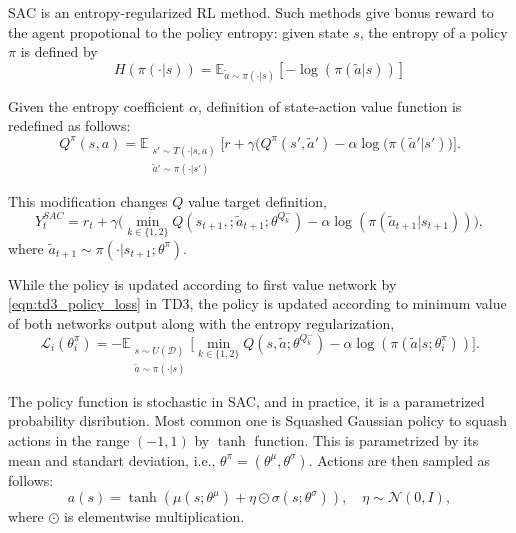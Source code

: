 \documentclass[a4paper, 12pt]{article} %
\begin{document}
SAC is an entropy-regularized RL method. Such methods give bonus reward to the agent propotional to the policy entropy: given state $s$, the entropy of a policy $\pi$ is defined by
\begin{equation}
\label{eqn:policy_entropy}
H(\pi(\cdot|s)) = \mathbb{E}_{\widetilde{a}\sim\pi(\cdot|s)}[-\log(\pi(\widetilde{a}|s))]
\end{equation}

Given the entropy coefficient $\alpha$, definition of state-action value function is redefined as follows: 
\begin{equation}
\label{eqn:q_dfn_entreg}
Q^{\pi}(s,a) = \mathbb{E}_{\substack{s'\sim T(\cdot|s,a)\\\widetilde{a}'\sim \pi(\cdot|s')} } \Big[r + \gamma \Big(Q^{\pi}(s',\widetilde{a}') -\alpha\log(\pi(\widetilde{a}'|s') \Big) \Big]. %
\end{equation}

This modification changes $Q$ value target definition,
\begin{equation}
\label{eqn:q_target_sac}
Y_t^{SAC} = r_t + \gamma \Big(\min_{k\in\{1,2\}} Q(s_{t+1}, ;\widetilde{a}_{t+1};\theta^{Q_k^-}) -\alpha\log(\pi(\widetilde{a}_{t+1}|s_{t+1})) \Big),
\end{equation}
where $\widetilde{a}_{t+1} \sim \pi(\cdot|s_{t+1}; \theta^{\pi})$.

While the policy is updated according to first value network by \eqref{eqn:td3_policy_loss} in TD3, the policy is updated according to minimum value of both networks output along with the entropy regularization, 
\begin{equation}
\label{eqn:sac_policy_loss}
\mathcal{L}_i(\theta^\pi_i) = - \mathbb{E}_{\substack{s \sim U(\mathcal{D})\\\widetilde{a} \sim \pi(\cdot|s)}} \Big[ \min_{k\in\{1,2\}} Q(s, \widetilde{a};\theta^{Q_k^-}) - \alpha\log(\pi(\widetilde{a}|s;\theta^\pi_i)) \Big].
\end{equation}

The policy function is stochastic in SAC, and in practice, it is a parametrized probability disribution. Most common one is 
Squashed Gaussian policy to squash actions in the range $(-1,1)$ by $\tanh$ function. 
This is parametrized by its mean and standart deviation, i.e., $\theta^{\pi}=(\theta^{\mu}, \theta^{\sigma})$. Actions are then sampled as follows: 
\begin{equation}
\label{eqn:squashed_gp_sampling}
a(s) = \tanh(\mu(s; \theta^{\mu}) + \eta \odot \sigma(s; \theta^{\sigma})), \quad \eta \sim \mathcal{N}(0, I), 
\end{equation}
where $\odot$ is elementwise multiplication.
\end{document}
